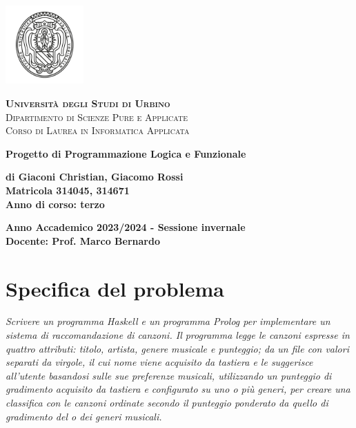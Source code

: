 \documentclass[a4paper,11pt]{article}
\begin{document}
\begin{center}
    \includegraphics[width=3cm]{logo.png}
\end{center}

\begin{center}
    \textsc{\textbf{Università degli Studi di Urbino}}\\
    \textsc{Dipartimento di Scienze Pure e Applicate}\\
    \textsc{Corso di Laurea in Informatica Applicata}
\end{center}

\vspace{2cm}

\begin{center}
    \textbf{\Large Progetto di Programmazione Logica e Funzionale}
\end{center}

\vspace{2cm}

\begin{center}
    \textbf{di Giaconi Christian, Giacomo Rossi} \\ %
    \textbf{Matricola 314045, 314671} \\ %
    \textbf{Anno di corso: terzo}
\end{center}

\vspace{2cm}

\begin{center}
    \textbf{Anno Accademico 2023/2024 - Sessione invernale}\\
    \vspace{1cm}
    \textbf{Docente: Prof. Marco Bernardo}
\end{center}

\newpage
\tableofcontents

\newpage
\section{Specifica del problema}
\textit{Scrivere un programma Haskell e un programma Prolog per implementare un sistema di raccomandazione di canzoni. Il programma legge le canzoni espresse in quattro attributi: titolo, artista, genere musicale e punteggio; da un file con valori separati da virgole, il cui nome viene acquisito da tastiera e le suggerisce all’utente basandosi sulle sue preferenze musicali, utilizzando un punteggio di gradimento acquisito da tastiera e configurato su uno o più generi, per creare una classifica con le canzoni ordinate secondo il punteggio ponderato da quello di gradimento del o dei generi musicali.}
\end{document}
